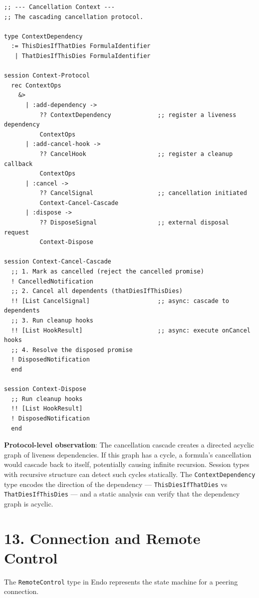 \documentclass[11pt]{article}
\begin{document}
\begin{verbatim}
;; --- Cancellation Context ---
;; The cascading cancellation protocol.

type ContextDependency
  := ThisDiesIfThatDies FormulaIdentifier
   | ThatDiesIfThisDies FormulaIdentifier

session Context-Protocol
  rec ContextOps
    &>
      | :add-dependency ->
          ?? ContextDependency             ;; register a liveness dependency
          ContextOps
      | :add-cancel-hook ->
          ?? CancelHook                    ;; register a cleanup callback
          ContextOps
      | :cancel ->
          ?? CancelSignal                  ;; cancellation initiated
          Context-Cancel-Cascade
      | :dispose ->
          ?? DisposeSignal                 ;; external disposal request
          Context-Dispose

session Context-Cancel-Cascade
  ;; 1. Mark as cancelled (reject the cancelled promise)
  ! CancelledNotification
  ;; 2. Cancel all dependents (thatDiesIfThisDies)
  !! [List CancelSignal]                   ;; async: cascade to dependents
  ;; 3. Run cleanup hooks
  !! [List HookResult]                     ;; async: execute onCancel hooks
  ;; 4. Resolve the disposed promise
  ! DisposedNotification
  end

session Context-Dispose
  ;; Run cleanup hooks
  !! [List HookResult]
  ! DisposedNotification
  end
\end{verbatim}

\textbf{Protocol-level observation}: The cancellation cascade creates a directed
acyclic graph of liveness dependencies. If this graph has a cycle, a
formula's cancellation would cascade back to itself, potentially causing
infinite recursion. Session types with recursive structure can detect such
cycles statically. The \texttt{ContextDependency} type encodes the direction of the
dependency --- \texttt{ThisDiesIfThatDies} vs \texttt{ThatDiesIfThisDies} --- and a
static analysis can verify that the dependency graph is acyclic.
\section{13. Connection and Remote Control}
\label{sec:org4b28f10}

The \texttt{RemoteControl} type in Endo represents the state machine for a peering
connection.
\end{document}
